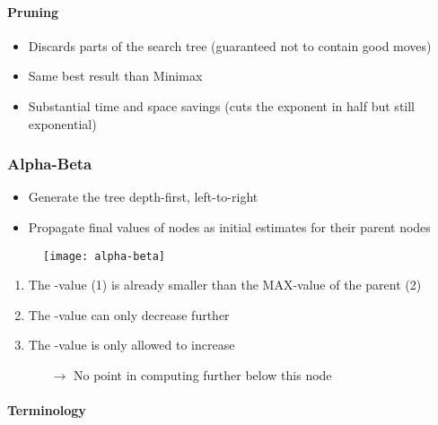 \paragraph{Pruning}

\begin{itemize}
\item Discards parts of the search tree (guaranteed not to contain good moves)
\item Same best result than Minimax
\item Substantial time and space savings (cuts the exponent in half but still exponential)
\end{itemize}

\subsubsection{Alpha-Beta}

\begin{itemize}
\item Generate the tree depth-first, left-to-right
\item Propagate final values of nodes as initial estimates for their parent nodes
\end{itemize}
\begin{minipage}{0.4\textwidth}
	\begin{figure}[H]
		\centering
		\texttt{[image: alpha-beta]}
	\end{figure}
\end{minipage}
\begin{minipage}{0.58\textwidth}
	\begin{enumerate}
	\item The -value (1) is already smaller than the MAX-value of the parent (2)
	\item The -value can only decrease further
	\item The -value is only allowed to increase
		\begin{enumerate}
		\item[$\rightarrow$] No point in computing further below this node
		\end{enumerate}
	\end{enumerate}
\end{minipage}

\paragraph{Terminology}

